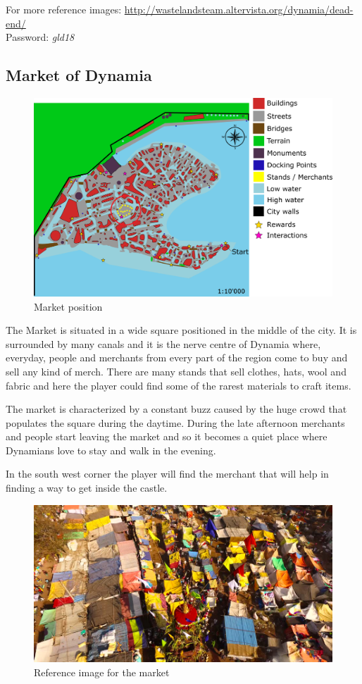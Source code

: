 For more reference images: \url{http://wastelandsteam.altervista.org/dynamia/dead-end/}\\
Password: \textit{gld18}

\subsection{Market of Dynamia}
\begin{figure}[H]
  \centering
  \includegraphics[width=\textwidth]{Images/Maps/dynamia_market}
  \caption{Market position}
\end{figure}

The Market is situated in a wide square positioned in the middle of the city. It is surrounded by many canals and it is the nerve centre of Dynamia where, everyday, people and merchants from every part of the region come to buy and sell any kind of merch. There are many stands that sell clothes, hats, wool and fabric and here the player could find some of the rarest materials to craft items.

The market is characterized by a constant buzz caused by the huge crowd that populates  the square during the daytime. During the late afternoon merchants and people start leaving the market and so it becomes a quiet place where Dynamians love to stay and walk in the evening.

In the south west corner the player will find the merchant that will help in finding a way to get inside the castle.
 
\begin{figure}[H]
  \centering
  \includegraphics[width=\textwidth]{Images/Landmarks/market}
  \caption{Reference image for the market}
\end{figure}

